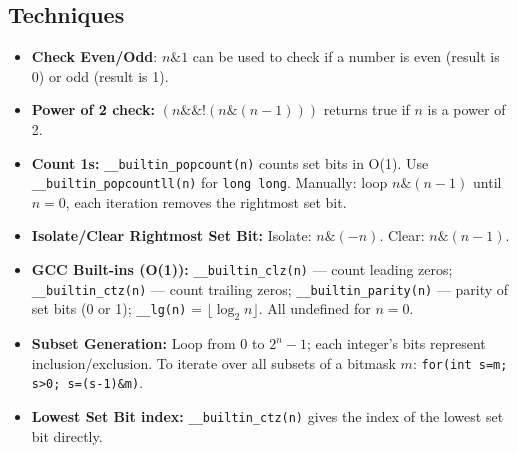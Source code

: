 \subsection{Techniques}

\begin{itemize}
    \item \textbf{Check Even/Odd}: \texttt{$n \& 1$} can be used to check if a number is even (result is 0) or odd (result is 1).
    \item \textbf{Power of 2 check: } \texttt{$(n \&\& !(n \& (n - 1)))$} returns true if $n$ is a power of 2.
    \item \textbf{Count 1s: } \texttt{\_\_builtin\_popcount(n)} counts set bits in O(1). Use \texttt{\_\_builtin\_popcountll(n)} for \texttt{long long}. Manually: loop \texttt{$n \& (n-1)$} until $n = 0$, each iteration removes the rightmost set bit.
    \item \textbf{Isolate/Clear Rightmost Set Bit: } Isolate: \texttt{$n \& (-n)$}. Clear: \texttt{$n \& (n - 1)$}.
    \item \textbf{GCC Built-ins (O(1)):} \texttt{\_\_builtin\_clz(n)} — count leading zeros; \texttt{\_\_builtin\_ctz(n)} — count trailing zeros; \texttt{\_\_builtin\_parity(n)} — parity of set bits (0 or 1); \texttt{\_\_lg(n)} = $\lfloor \log_2 n \rfloor$. All undefined for $n = 0$.
    \item \textbf{Subset Generation: } Loop from $0$ to $2^n - 1$; each integer's bits represent inclusion/exclusion. To iterate over all subsets of a bitmask $m$: \texttt{for(int s=m; s>0; s=(s-1)\&m)}.
    \item \textbf{Lowest Set Bit index: } \texttt{\_\_builtin\_ctz(n)} gives the index of the lowest set bit directly.
\end{itemize}